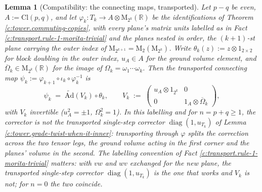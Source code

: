 \documentclass[11pt]{article}
\newtheorem{lemma}[theorem]{Lemma}
\theoremstyle{definition}
\theoremstyle{plain}
\newcommand{\changedmark}[2]{\marginpar{\raggedright\scriptsize\color{#1}#2}}
\providecommand{\Ad}{}\renewcommand{\Ad}{\widetilde{\mathrm{Ad}}}
\providecommand{\Cl}{}\renewcommand{\Cl}{\mathrm{Cl}}
\providecommand{\Mat}{}\renewcommand{\Mat}{\mathrm{M}}
\providecommand{\R}{}\renewcommand{\R}{\mathbb{R}}
\begin{document}
\begin{lemma}[Compatibility: the connecting maps, transported]\label{c:tower.compatibility-connecting-maps-transported}
\changedmark{BrickRed}{corrected since the deposit}
Let $p - q$ be even, $A := \Cl(p,q)$, and let $\varphi_k : T_k \to A \otimes \Mat_{2^k}(\R)$ be the identifications of Theorem \ref{c:tower.commuting-copies}, with every plane's matrix units labelled as in Fact \ref{c:transport.rule-1-morita-trivial} and the planes nested in order, the $(k{+}1)$-st plane carrying the outer index of $\Mat_{2^{k+1}} = \Mat_2(\Mat_{2^k})$. Write $\theta_k(z) := z \otimes 1_{2 \times 2}$ for block doubling in the outer index, $u_A \in A$ for the ground volume element, and $\overline\Omega_k \in \Mat_{2^k}(\R)$ for the image of $\Omega_k = \omega_1 \cdots \omega_k$. Then the transported connecting map $\psi_k := \varphi_{k+1} \circ \iota_k \circ \varphi_k^{-1}$ is
\[
\psi_k \;=\; \Ad(V_k) \circ \theta_k, \qquad
V_k \;:=\; \begin{pmatrix} u_A \otimes 1_{2^k} & 0 \\ 0 & 1_A \otimes \overline\Omega_k \end{pmatrix},
\]
with $V_k$ invertible ($u_A^2 = \pm 1$, $\Omega_k^2 = 1$). In this labelling and for $n = p + q \ge 1$, the corrector is \emph{not} the transported single-step corrector $\operatorname{diag}(1, u_{T_k})$ of Lemma \ref{c:tower.grade-twist-when-it-inner}: transporting through $\varphi$ splits the correction across the two tensor legs, the ground volume acting in the first corner and the planes' volume in the second. The labelling convention of Fact \ref{c:transport.rule-1-morita-trivial} matters: with $vw$ and $wv$ exchanged for the new plane, the transported single-step corrector $\operatorname{diag}(1, u_{T_k})$ is the one that works and $V_k$ is not; for $n = 0$ the two coincide.
\end{lemma}
\end{document}
